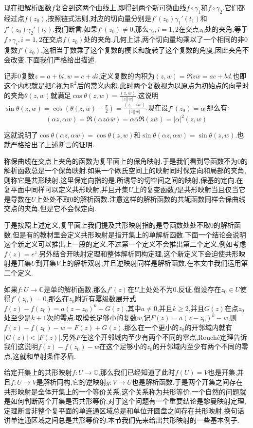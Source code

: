 现在把解析函数$f$复合到这两个曲线上,即得到两个新可微曲线$f\circ\gamma_1$和$f\circ\gamma_2$.它们都经过点$f(z_0)$,按照链式法则,对应的切向量分别是$f'(z_0)\gamma_1'(t_1)$和$f'(z_0)\gamma_2'(t_2)$.我们断言,如果$f'(z_0)\not=0$,那么$\gamma_i,i=1,2$在交点$z_0$处的夹角,等于$f\circ\gamma_i,i=1,2$在交点$f(z_0)$处的夹角.几何上讲,两个切向量均乘以了一个相同的非0复数$f'(z_0)$,这相当于数乘了这个复数的模长和旋转了这个复数的角度,因此夹角不会改变.下面我们严格给出描述.

记非0复数$z=a+bi,w=c+di$,定义复数的内积为$(z,w)=\Re{z\overline{w}}=ac+bd$.也即这个内积就是把$\mathbb{C}$视为$\mathbb{R}^2$后的常义内积.此时两个复数视为以原点为初始点的向量时的夹角$\theta(z,w)$就满足$\cos\theta(z,w)=\frac{(z,w)}{|z||w|}$.这说明$\sin\theta(z,w)=\cos\left(\theta(z,w)-\frac{\pi}{2}\right)=\frac{(z,-iw)}{|z||w|}$.现在设$f'(z_0)=\alpha$,那么有:
$$(\alpha z,\alpha w)=\Re(\alpha z\overline{\alpha}\overline{w})=\alpha\overline{\alpha}\Re(z\overline{w})=|\alpha|^2(z,w)$$

这就说明了$\cos\theta(\alpha z,\alpha w)=\cos\theta(z,w)$和$\sin\theta(\alpha z,\alpha w)=\sin\theta(z,w)$.也就严格给出了上述断言的证明.

称保曲线在交点上夹角的函数为复平面上的保角映射.于是我们看到导函数不为0的解析函数总是一个保角映射.如果一个欧氏空间上的映射同时保定向和局部的夹角,则称它是共形映射.这里保定向指的是,所诱导的切空间之间的映射,保基的定向.在复平面中同样可以定义共形映射,并且开集$U$上的复变函数$f$是共形映射当且仅当它是导数在$U$上处处不取0的解析函数.注意这样的解析函数的共轭函数同样会保曲线交点的夹角,但是它不会保定向.

于是按照上述定义,复平面上我们提及共形映射指的是导函数处处不取0的解析函数.但是有的教材里会定义共形映射是指开集上的单解析函数.下面一个结论会说明这个新定义可以推出上一段的定义.不过第一个定义不会推出第二个定义,例如考虑$f(z)=e^z$.另外结合开映射定理和整体解析同构定理,这个新定义下会迫使共形映射是开集$U$到开集$V$上的解析双射,并且逆映射同样是解析函数.在本文中我们运用第二个定义.

如果$f:U\to\mathbb{C}$是单的解析函数,那么$f'(z)$在$U$上处处不为0.反证,假设存在$z_0\in U$使得$f'(z_0)=0$,那么在$z_0$附近有幂级数展开式$f(z)-f(z_0)=a(z-z_0)^k+G(z)$,其中$a\not=0$,并且$k\ge2$,并且$G(z)$在点$z_0$处至少是$k+1$次的零点.取模长足够小的复数$w$,记$F(z)=a(z-z_0)^k-w$,则$f(z)-f(z_0)-w=F(z)+G(z)$.那么在一个更小的$z_0$的开邻域内就有$|G(z)|<|F(z)|$.另外$F$在这个开邻域内至少有两个不同的零点,Rouch\'e定理告诉我们这说明$f(z)-f(z_0)-w$在这个足够小的$z_0$的开邻域内至少有两个不同的零点,这就和单射条件矛盾.

给定开集上的共形映射$f:U\to\mathbb{C}$,那么我们已经知道了此时$f(U)=V$也是开集,并且$f:U\to V$是解析同构,它的逆映射$g:V\to U$也是解析函数.于是两个开集之间存在共形映射是全体开集上的一个等价关系,这个关系称为共形等价.一个自然的问题就是如何判断两个开集是否共形等价.对于这个问题有一个重要结论是黎曼映射定理,定理断言非整个复平面的单连通区域总是和单位开圆盘之间存在共形映射.换句话讲单连通区域之间总是共形等价的.本节我们先来给出共形映射的一些基本例子.


